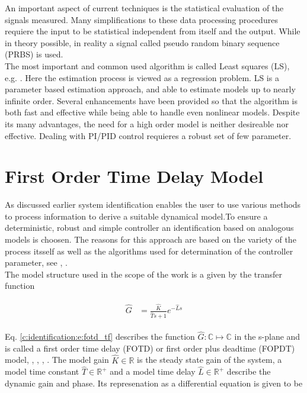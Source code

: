 An important aspect of current techniques is the statistical evaluation of the signals measured. Many simplifications to these data processing procedures requiere the input to be statistical independent from itself and the output. While in theory possible, in reality a signal called pseudo random binary sequence (PRBS) is used.\\

The most important and common used algorithm is called Least squares (LS), e.g. \cite[p.62 ff.]{Keesman2011}. Here the estimation process is viewed as a regression problem. LS is a parameter based estimation approach, and able to estimate models up to nearly infinite order. Several enhancements have been provided so that the algorithm is both fast and effective while being able to handle even nonlinear models. Despite its many advantages, the need for a high order model is neither desireable nor effective. Dealing with PI/PID control requieres a robust set of few parameter.\\

\section{First Order Time Delay Model}%
\label{c:identification:s:fotd}

As discussed earlier system identification enables the user to use various methods to process information to derive a suitable dynamical model.To ensure a deterministic, robust and simple controller an identification based on analogous models is choosen. The reasons for this approach are based on the variety of the process itsself as well as the algorithms used for determination of the controller parameter, see \cite{Astrom1995}, \cite{Astrom2006}.\\

The model structure used in the scope of the work is a given by the transfer function

\begin{align}
\begin{split}
\hat{G} &= \frac{\hat{K}}{\hat{T}s+1}e^{-\hat{L}s}
\end{split}
\label{c:identification:e:fotd_tf}
\end{align}

Eq. \ref{c:identification:e:fotd_tf} describes the function $\hat{G}: \mathbb{C} \mapsto \mathbb{C}$ in the s-plane and is called a first order time delay (FOTD) or first order plus deadtime (FOPDT) model, \cite[p.16]{Astrom1995}, \cite[p.20, p.26]{Astrom2006}, \cite{Fedele2009a}, \cite{Bi1999}.
The model gain $\hat{K} \in \mathbb{R}$ is the steady state gain of the system, a model time constant $\hat{T} \in \mathbb{R}^+$ and a model time delay $\hat{L} \in \mathbb{R}^+$ describe the dynamic gain and phase. Its represenation as a differential equation is given to be


